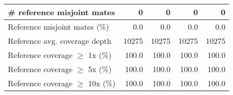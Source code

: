 \documentclass[12pt,a4paper]{article}
\begin{document}
\begin{table}[ht]
\begin{center}
\begin{tabular}{|l*{4}{|r}|}
\# reference misjoint mates & 0 & 0 & 0 & 0 \\ \hline
Reference misjoint mates (\%) & 0.0 & 0.0 & 0.0 & 0.0 \\ \hline
Reference avg. coverage depth & 10275 & 10275 & 10275 & 10275 \\ \hline
Reference coverage $\geq$ 1x (\%) & 100.0 & 100.0 & 100.0 & 100.0 \\ \hline
Reference coverage $\geq$ 5x (\%) & 100.0 & 100.0 & 100.0 & 100.0 \\ \hline
Reference coverage $\geq$ 10x (\%) & 100.0 & 100.0 & 100.0 & 100.0 \\ \hline
\end{tabular}
\end{center}
\end{table}
\end{document}
